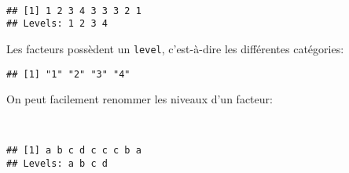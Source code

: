 \begin{knitrout}
\color{fgcolor}\begin{kframe}
\begin{flushleft}
\ttfamily\noindent
{}\hlassignement{\usebox{\hlnormalsizeboxlessthan}-}{\ }\hlkeyword{(}\hlkeyword{(}\hlkeyword{,}{\ }\hlkeyword{,}{\ }\hlkeyword{,}{\ }\hlkeyword{,}{\ }\hlkeyword{,}{\ }\hlkeyword{,}{\ }\hlkeyword{,}{\ }\hlkeyword{,}{\ }\hlkeyword{)}\hlkeyword{)}\hspace*{\fill}\\
\hlstd{}\mbox{}
\normalfont
\end{flushleft}
\begin{verbatim}
## [1] 1 2 3 4 3 3 3 2 1
## Levels: 1 2 3 4
\end{verbatim}
\end{kframe}
\end{knitrout}


Les facteurs possèdent un \texttt{level}, c'est-à-dire les différentes catégories:

\begin{knitrout}
\color{fgcolor}\begin{kframe}
\begin{flushleft}
\ttfamily\noindent
{}\hlkeyword{(}\hlkeyword{)}\mbox{}
\normalfont
\end{flushleft}
\begin{verbatim}
## [1] "1" "2" "3" "4"
\end{verbatim}
\end{kframe}
\end{knitrout}


On peut facilement renommer les niveaux d'un facteur:

\begin{knitrout}
\color{fgcolor}\begin{kframe}
\begin{flushleft}
\ttfamily\noindent
{}\hlkeyword{(}\hlkeyword{)}{\ }\hlassignement{\usebox{\hlnormalsizeboxlessthan}-}{\ }\hlkeyword{(}\hlkeyword{,}{\ }\hlkeyword{,}{\ }\hlkeyword{,}{\ }\hlkeyword{)}\hspace*{\fill}\\
\hlstd{}\mbox{}
\normalfont
\end{flushleft}
\begin{verbatim}
## [1] a b c d c c c b a
## Levels: a b c d
\end{verbatim}
\end{kframe}
\end{knitrout}


